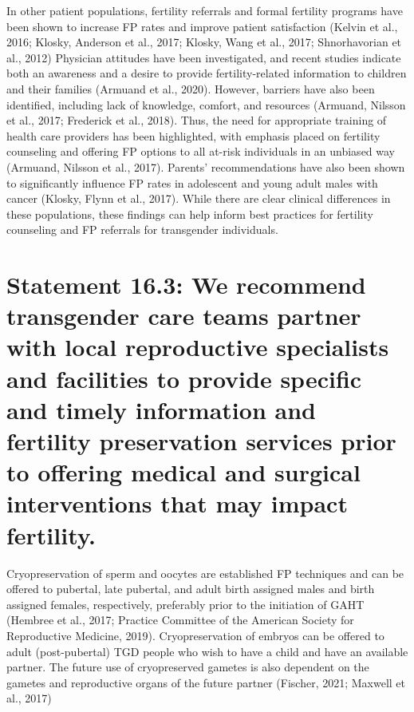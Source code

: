 \documentclass[
]{book}
\begin{document}
In other patient populations, fertility referrals
and formal fertility programs have been shown
to increase FP rates and improve patient satisfaction (Kelvin et al., 2016; Klosky, Anderson
et al., 2017; Klosky, Wang et al., 2017;
Shnorhavorian et al., 2012) Physician attitudes
have been investigated, and recent studies indicate both an awareness and a desire to provide
fertility-related information to children and their
families (Armuand et al., 2020). However, barriers have also been identified, including lack
of knowledge, comfort, and resources (Armuand,
Nilsson et al., 2017; Frederick et al., 2018).
Thus, the need for appropriate training of health
care providers has been highlighted, with
emphasis placed on fertility counseling and
offering FP options to all at-risk individuals in
an unbiased way (Armuand, Nilsson et al.,
2017). Parents' recommendations have also been
shown to significantly influence FP rates in adolescent and young adult males with cancer
(Klosky, Flynn et al., 2017). While there are
clear clinical differences in these populations,
these findings can help inform best practices
for fertility counseling and FP referrals for
transgender individuals.

\hypertarget{statement-16.3-we-recommend-transgender-care-teams-partner-with-local-reproductive-specialists-and-facilities-to-provide-specific-and-timely-information-and-fertility-preservation-services-prior-to-offering-medical-and-surgical-interventions-that-may-impact-fertility.}{%
\section*{Statement 16.3: We recommend transgender care teams partner with local reproductive specialists and facilities to provide specific and timely information and fertility preservation services prior to offering medical and surgical interventions that may impact fertility.}\label{statement-16.3-we-recommend-transgender-care-teams-partner-with-local-reproductive-specialists-and-facilities-to-provide-specific-and-timely-information-and-fertility-preservation-services-prior-to-offering-medical-and-surgical-interventions-that-may-impact-fertility.}}

Cryopreservation of sperm and oocytes are
established FP techniques and can be offered to
pubertal, late pubertal, and adult birth assigned
males and birth assigned females, respectively,
preferably prior to the initiation of GAHT
(Hembree et al., 2017; Practice Committee of the
American Society for Reproductive Medicine,
2019). Cryopreservation of embryos can be
offered to adult (post-pubertal) TGD people who
wish to have a child and have an available partner. The future use of cryopreserved gametes is
also dependent on the gametes and reproductive
organs of the future partner (Fischer, 2021;
Maxwell et al., 2017)
\end{document}
